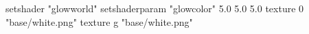 setshader "glowworld"
setshaderparam "glowcolor" 5.0 5.0 5.0
   texture 0 "base/white.png"
   texture g "base/white.png"
